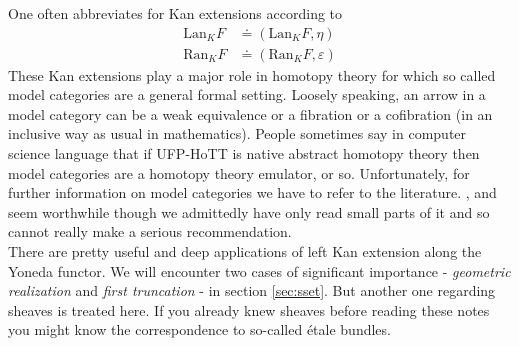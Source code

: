 One often abbreviates for Kan extensions according to
\begin{align*}
  \mathrm{Lan}_{K}F
  &\doteq
  \left(
    \mathrm{Lan}_{K}F,
    \eta
  \right)
  \\
  \mathrm{Ran}_{K}F
  &\doteq
  \left(
    \mathrm{Ran}_{K}F,
    \varepsilon
  \right)
\end{align*}
These Kan extensions play a major role in homotopy theory for which so called {\glqq}model categories{\grqq} are a general formal setting. Loosely speaking, an arrow in a model category can be a weak equivalence or a fibration or a cofibration (in an inclusive way as usual in mathematics). People sometimes say in computer science language that if UFP-HoTT is native abstract homotopy theory then model categories are a homotopy theory emulator, or so. Unfortunately, for further information on model categories we have to refer to the literature. \cite{791993d6}, \cite{70961a11} and \cite{7a40623d} seem worthwhile though we admittedly have only read small parts of it and so cannot really make a serious recommendation.
\\
There are pretty useful and deep applications of left Kan extension along the Yoneda functor. We will encounter two cases of significant importance - \textit{geometric realization} and \textit{first truncation} - in section \ref{sec:sset}. But another one regarding sheaves is treated here. If you already knew sheaves before reading these notes you might know the correspondence to so-called {\'e}tale bundles.
\\
